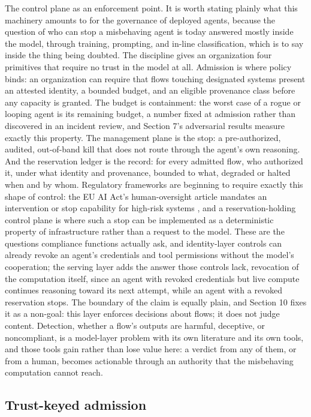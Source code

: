The control plane as an enforcement point. It is worth stating plainly
what this machinery amounts to for the governance of deployed agents,
because the question of who can stop a misbehaving agent is today
answered mostly inside the model, through training, prompting, and
in-line classification, which is to say inside the thing being doubted.
The discipline gives an organization four primitives that require no
trust in the model at all. Admission is where policy binds: an
organization can require that flows touching designated systems present
an attested identity, a bounded budget, and an eligible provenance class
before any capacity is granted. The budget is containment: the worst
case of a rogue or looping agent is its remaining budget, a number fixed
at admission rather than discovered in an incident review, and Section
7's adversarial results measure exactly this property. The management
plane is the stop: a pre-authorized, audited, out-of-band kill that does
not route through the agent's own reasoning. And the reservation ledger
is the record: for every admitted flow, who authorized it, under what
identity and provenance, bounded to what, degraded or halted when and by
whom. Regulatory frameworks are beginning to require exactly this shape
of control: the EU AI Act's human-oversight article mandates an
intervention or stop capability for high-risk systems \citep{euaiact_art14},
and a reservation-holding control plane is where such a stop can be
implemented as a deterministic property of infrastructure rather than a
request to the model. These are the questions compliance functions
actually ask, and identity-layer controls can already revoke an agent's
credentials and tool permissions without the model's cooperation; the
serving layer adds the answer those controls lack, revocation of the
computation itself, since an agent with revoked credentials but live
compute continues reasoning toward its next attempt, while an agent with
a revoked reservation stops. The boundary of the claim is equally plain,
and Section 10 fixes it as a non-goal: this layer enforces decisions
about flows; it does not judge content. Detection, whether a flow's
outputs are harmful, deceptive, or noncompliant, is a model-layer problem
with its own literature and its own tools, and those tools gain rather
than lose value here: a verdict from any of them, or from a human,
becomes actionable through an authority that the misbehaving computation
cannot reach.

\subsection{Trust-keyed admission}

